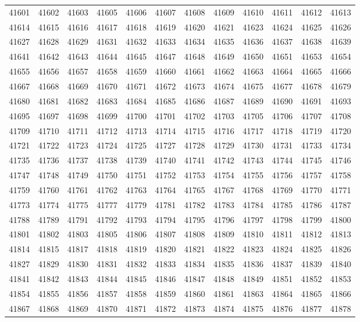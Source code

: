 \begin{center}
\begin{longtable}{llllllllllll}
41601 &41602 &41603 &41605 &41606 &41607 &41608 &41609 &41610 &41611 &41612 &41613 \\
41614 &41615 &41616 &41617 &41618 &41619 &41620 &41621 &41623 &41624 &41625 &41626 \\
41627 &41628 &41629 &41631 &41632 &41633 &41634 &41635 &41636 &41637 &41638 &41639 \\
41641 &41642 &41643 &41644 &41645 &41647 &41648 &41649 &41650 &41651 &41653 &41654 \\
41655 &41656 &41657 &41658 &41659 &41660 &41661 &41662 &41663 &41664 &41665 &41666 \\
41667 &41668 &41669 &41670 &41671 &41672 &41673 &41674 &41675 &41677 &41678 &41679 \\
41680 &41681 &41682 &41683 &41684 &41685 &41686 &41687 &41689 &41690 &41691 &41693 \\
41695 &41697 &41698 &41699 &41700 &41701 &41702 &41703 &41705 &41706 &41707 &41708 \\
41709 &41710 &41711 &41712 &41713 &41714 &41715 &41716 &41717 &41718 &41719 &41720 \\
41721 &41722 &41723 &41724 &41725 &41727 &41728 &41729 &41730 &41731 &41733 &41734 \\
41735 &41736 &41737 &41738 &41739 &41740 &41741 &41742 &41743 &41744 &41745 &41746 \\
41747 &41748 &41749 &41750 &41751 &41752 &41753 &41754 &41755 &41756 &41757 &41758 \\
41759 &41760 &41761 &41762 &41763 &41764 &41765 &41767 &41768 &41769 &41770 &41771 \\
41773 &41774 &41775 &41777 &41779 &41781 &41782 &41783 &41784 &41785 &41786 &41787 \\
41788 &41789 &41791 &41792 &41793 &41794 &41795 &41796 &41797 &41798 &41799 &41800 \\
41801 &41802 &41803 &41805 &41806 &41807 &41808 &41809 &41810 &41811 &41812 &41813 \\
41814 &41815 &41817 &41818 &41819 &41820 &41821 &41822 &41823 &41824 &41825 &41826 \\
41827 &41829 &41830 &41831 &41832 &41833 &41834 &41835 &41836 &41837 &41839 &41840 \\
41841 &41842 &41843 &41844 &41845 &41846 &41847 &41848 &41849 &41851 &41852 &41853 \\
41854 &41855 &41856 &41857 &41858 &41859 &41860 &41861 &41863 &41864 &41865 &41866 \\
41867 &41868 &41869 &41870 &41871 &41872 &41873 &41874 &41875 &41876 &41877 &41878 \\

\end{longtable}
\end{center}
